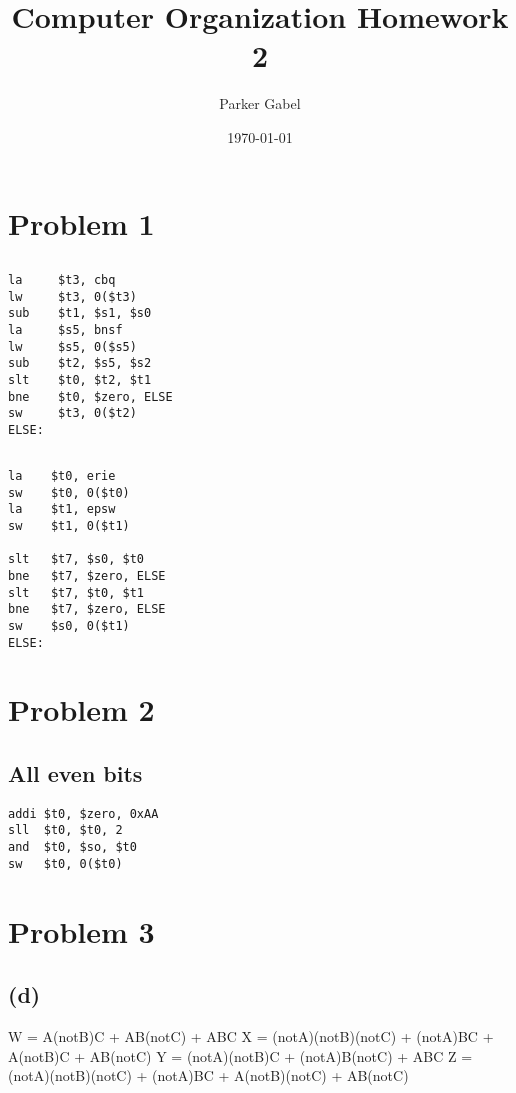 \documentclass[11pt]{article}
\author{Parker Gabel}
\date{\today}
\title{Computer Organization Homework 2}
\begin{document}
\maketitle

\section{Problem 1}
\label{sec:org60b48fa}
\subsection{}
\label{sec:orgae494ed}
\begin{verbatim}
la     $t3, cbq
lw     $t3, 0($t3)
sub    $t1, $s1, $s0
la     $s5, bnsf
lw     $s5, 0($s5)
sub    $t2, $s5, $s2
slt    $t0, $t2, $t1
bne    $t0, $zero, ELSE
sw     $t3, 0($t2)
ELSE:
\end{verbatim}
\subsection{}
\label{sec:orgb330fb3}
\begin{verbatim}
la    $t0, erie
sw    $t0, 0($t0)
la    $t1, epsw
sw    $t1, 0($t1)

slt   $t7, $s0, $t0
bne   $t7, $zero, ELSE
slt   $t7, $t0, $t1
bne   $t7, $zero, ELSE
sw    $s0, 0($t1)
ELSE:
\end{verbatim}
\section{Problem 2}
\label{sec:orgc1f7ec8}
\subsection{All even bits}
\label{sec:orge9414b6}
\begin{verbatim}
addi $t0, $zero, 0xAA
sll  $t0, $t0, 2
and  $t0, $so, $t0
sw   $t0, 0($t0)
\end{verbatim}
\section{Problem 3}
\label{sec:org75f4f59}
\subsection{(d)}
\label{sec:org30ff555}
W = A(notB)C + AB(notC) + ABC
X = (notA)(notB)(notC) + (notA)BC + A(notB)C + AB(notC)
Y = (notA)(notB)C + (notA)B(notC) + ABC
Z = (notA)(notB)(notC) + (notA)BC + A(notB)(notC) + AB(notC)
\end{document}

